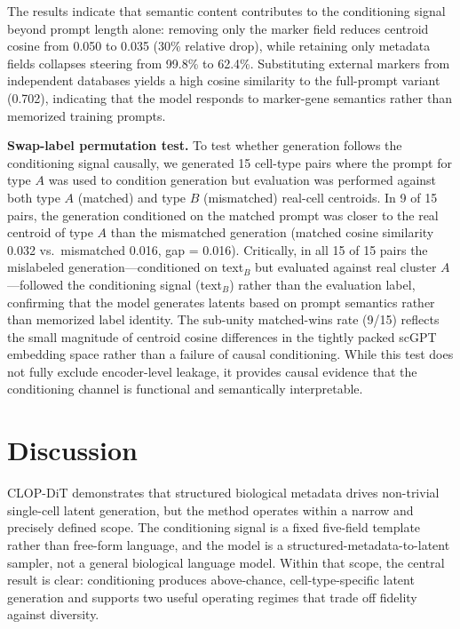 \documentclass[genes,article,submit,pdftex,oneauthor]{Definitions/mdpi}
\begin{document}
The results indicate that semantic content contributes to the conditioning signal beyond prompt length alone: removing only the marker field reduces centroid cosine from 0.050 to 0.035 (30\% relative drop), while retaining only metadata fields collapses steering from 99.8\% to 62.4\%. Substituting external markers from independent databases yields a high cosine similarity to the full-prompt variant (0.702), indicating that the model responds to marker-gene semantics rather than memorized training prompts.

\textbf{Swap-label permutation test.} To test whether generation follows the conditioning signal causally, we generated 15 cell-type pairs where the prompt for type $A$ was used to condition generation but evaluation was performed against both type $A$ (matched) and type $B$ (mismatched) real-cell centroids. In 9 of 15 pairs, the generation conditioned on the matched prompt was closer to the real centroid of type $A$ than the mismatched generation (matched cosine similarity 0.032 vs.\ mismatched 0.016, gap = 0.016). Critically, in all 15 of 15 pairs the mislabeled generation---conditioned on text$_B$ but evaluated against real cluster $A$---followed the conditioning signal (text$_B$) rather than the evaluation label, confirming that the model generates latents based on prompt semantics rather than memorized label identity. The sub-unity matched-wins rate (9/15) reflects the small magnitude of centroid cosine differences in the tightly packed scGPT embedding space rather than a failure of causal conditioning. While this test does not fully exclude encoder-level leakage, it provides causal evidence that the conditioning channel is functional and semantically interpretable.

\section{Discussion}\label{sec:discussion}

CLOP-DiT demonstrates that structured biological metadata drives non-trivial single-cell latent generation, but the method operates within a narrow and precisely defined scope. The conditioning signal is a fixed five-field template rather than free-form language, and the model is a structured-metadata-to-latent sampler, not a general biological language model. Within that scope, the central result is clear: conditioning produces above-chance, cell-type-specific latent generation and supports two useful operating regimes that trade off fidelity against diversity.
\end{document}

